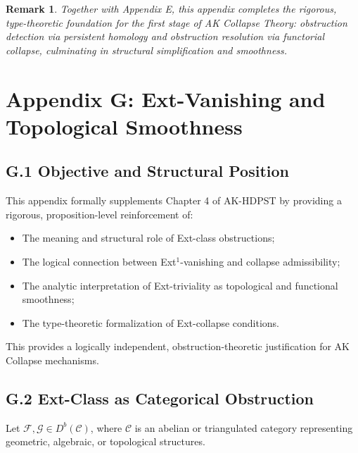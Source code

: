 \documentclass[11pt]{article}
\newtheorem{remark}[theorem]{Remark}
\begin{document}
\begin{remark}
Together with Appendix E, this appendix completes the rigorous, type-theoretic foundation for the first stage of AK Collapse Theory: obstruction detection via persistent homology and obstruction resolution via functorial collapse, culminating in structural simplification and smoothness.
\end{remark}



\section*{Appendix G: Ext-Vanishing and Topological Smoothness}

\subsection*{G.1 Objective and Structural Position}

This appendix formally supplements Chapter 4 of AK-HDPST by providing a rigorous, proposition-level reinforcement of:

\begin{itemize}
    \item The meaning and structural role of Ext-class obstructions;
    \item The logical connection between Ext$^1$-vanishing and collapse admissibility;
    \item The analytic interpretation of Ext-triviality as topological and functional smoothness;
    \item The type-theoretic formalization of Ext-collapse conditions.
\end{itemize}

This provides a logically independent, obstruction-theoretic justification for AK Collapse mechanisms.

\subsection*{G.2 Ext-Class as Categorical Obstruction}

Let \( \mathcal{F}, \mathcal{G} \in D^b(\mathcal{C}) \), where \( \mathcal{C} \) is an abelian or triangulated category representing geometric, algebraic, or topological structures.
\end{document}

